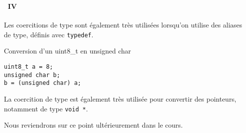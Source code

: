 \begin{frame}[containsverbatim]
  \frametitle{\secname}
  \framesubtitle{\subsecname~IV}
  
  Les coercitions de type sont également très utilisées lorsqu'on utilise des aliases de type, définis avec \verb|typedef|.
  \begin{exampleblock}{Conversion d'un uint8\_t en unsigned char}
    \begin{verbatim}
uint8_t a = 8;
unsigned char b;
b = (unsigned char) a;    
    \end{verbatim}
  \end{exampleblock}
  \vspace{0.5cm}
  \par
  La coercition de type est également très utilisée pour convertir des pointeurs, notamment de type \verb|void *|. 
  \par Nous reviendrons sur ce point ultérieurement dans le cours.
\end{frame}

